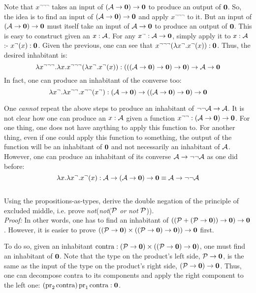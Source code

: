 Note that $x^{\neg\neg\neg}$ takes an input of $(\mathcal{A} \to \textbf{0}) \to \textbf{0}$ to produce an output of $\textbf{0}$. So, the idea is to find an input of $(\mathcal{A} \to \textbf{0}) \to \textbf{0}$ and apply $x^{\neg\neg\neg}$ to it. But an input of $(\mathcal{A} \to \textbf{0}) \to \textbf{0}$ must itself take an input of $\mathcal{A} \to \textbf{0}$ to produce an output of $\textbf{0}$. This is easy to construct given an $x : \mathcal{A}$. For any $x^{\neg} : \mathcal{A} \to \textbf{0}$, simply apply it to $x : \mathcal{A}$ :- $x^{\neg}(x) : \textbf{0}$.
Given the previous, one can see that $x^{\neg\neg\neg}(\lambda x^{\neg} . x^{\neg}(x)) : \textbf{0}$. Thus, the desired inhabitant is:
\[
	\lambda x^{\neg\neg\neg} . \lambda x . x^{\neg\neg\neg}(\lambda x^{\neg} . x^{\neg}(x)) : (((\mathcal{A} \to \textbf{0}) \to \textbf{0}) \to \textbf{0}) \to \mathcal{A} \to \textbf{0}
\]
In fact, one can produce an inhabitant of the converse too:
\[
	\lambda x^{\neg} . \lambda x^{\neg\neg} . x^{\neg\neg}(x^{\neg}) : (\mathcal{A} \to \textbf{0}) \to ((\mathcal{A} \to \textbf{0}) \to \textbf{0}) \to \textbf{0}
\]

 One \textit{cannot} repeat the above steps to produce an inhabitant of $\neg\neg \mathcal{A} \to \mathcal{A}$. It is not clear how one can produce an $x : \mathcal{A}$ given a function $x^{\neg\neg} : (\mathcal{A} \to \textbf{0}) \to \textbf{0}$. For one thing, one does not have anything to apply this function to. For another thing, even if one could apply this function to something, the output of the function will be an inhabitant of $\textbf{0}$ and not necessarily an inhabitant of $\mathcal{A}$. However, one can produce an inhabitant of its converse $\mathcal{A} \to \neg\neg \mathcal{A}$ as one did before:
\[
	\lambda x . \lambda x^{\neg} . x^{\neg}(x) : \mathcal{A} \to (\mathcal{A} \to \textbf{0}) \to \textbf{0} \equiv \mathcal{A} \to \neg\neg \mathcal{A}
\] \\



 Using the propositions-as-types, derive the double negation of the principle of excluded middle, i.e. prove \textit{not}(\textit{not}($\mathcal{P}$ \textit{or} \textit{not} $\mathcal{P}$)). \\


\textit{Proof:} In other words, one has to find an inhabitant of $((\mathcal{P} + (\mathcal{P} \to \textbf{0})) \to \textbf{0}) \to \textbf{0}$. However, it is easier to prove $((\mathcal{P} \to \textbf{0}) \times ((\mathcal{P} \to \textbf{0}) \to \textbf{0})) \to \textbf{0}$ first.

To do so, given an inhabitant $\text{contra} : (\mathcal{P} \to \textbf{0}) \times ((\mathcal{P} \to \textbf{0}) \to \textbf{0})$, one must find an inhabitant of $\textbf{0}$. Note that the type on the product's left side, $\mathcal{P} \to \textbf{0}$, is the same as the input of the type on the product's right side, $(\mathcal{P} \to \textbf{0}) \to \textbf{0}$. Thus, one can decompose $\text{contra}$ to its components and apply the right component to the left one: $(\text{pr}_{2}\,\text{contra})\,\text{pr}_{1}\,\text{contra} : \textbf{0}$.

